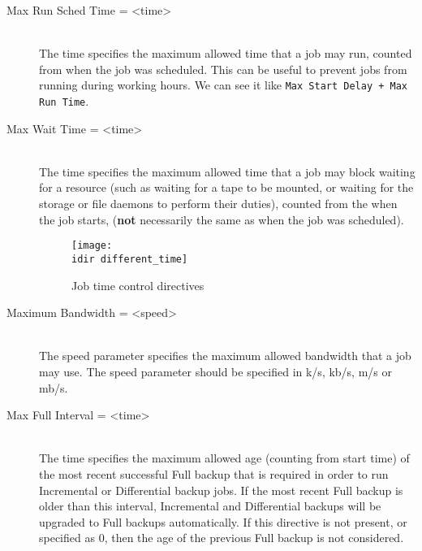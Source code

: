 \begin{description}
\item [Max Run Sched Time = {\textless}time{\textgreater}] \hfill \\
The time specifies the maximum allowed time that a job may run, counted from
when the job was scheduled. This can be useful to prevent jobs from running
during working hours. We can see it like \texttt{Max Start Delay + Max Run
Time}.

\item [Max Wait Time = {\textless}time{\textgreater}] \hfill \\
The time specifies the maximum allowed time that a job may block waiting
for a resource (such as waiting for a tape to be mounted, or waiting for
the storage or file daemons to perform their duties), counted from the
when the job starts, ({\bf not} necessarily the same as when the job was
scheduled).

\begin{figure}[htbp]
  \centering
  \texttt{[image: \\idir different\_time]}
  \caption{Job time control directives}
  \label{fig:differenttime}
\end{figure}

\item [Maximum Bandwidth = {\textless}speed{\textgreater}] \hfill \\
The speed parameter specifies the maximum allowed bandwidth that a job may
use. The speed parameter should be specified in k/s, kb/s, m/s or mb/s.

\item [Max Full Interval = {\textless}time{\textgreater}] \hfill \\
The time specifies the maximum allowed age (counting from start time) of
the most recent successful Full backup that is required in order to run
Incremental or Differential backup jobs. If the most recent Full backup
is older than this interval, Incremental and Differential backups will be
upgraded to Full backups automatically. If this directive is not present,
or specified as 0, then the age of the previous Full backup is not
considered.


\end{description}
